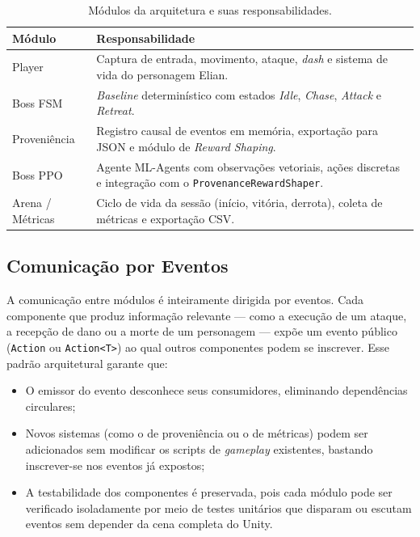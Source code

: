\begin{table}[htb]
    \centering
    \caption{Módulos da arquitetura e suas responsabilidades.}
    \label{tab:modulos}
    \begin{tabular}{l p{9.5cm}}
        \toprule
        \textbf{Módulo}     & \textbf{Responsabilidade} \\
        \midrule
        Player              & Captura de entrada, movimento, ataque, \textit{dash}
                              e sistema de vida do personagem Elian. \\
        \addlinespace
        Boss FSM             & \textit{Baseline} determinístico com estados
                              \textit{Idle}, \textit{Chase}, \textit{Attack} e
                              \textit{Retreat}. \\
        \addlinespace
        Proveniência         & Registro causal de eventos em memória, exportação
                              para JSON e módulo de \textit{Reward Shaping}. \\
        \addlinespace
        Boss PPO             & Agente ML-Agents com observações vetoriais, ações
                              discretas e integração com o
                              \texttt{ProvenanceRewardShaper}. \\
        \addlinespace
        Arena / Métricas     & Ciclo de vida da sessão (início, vitória, derrota),
                              coleta de métricas e exportação CSV. \\
        \bottomrule
    \end{tabular}
\end{table}

\subsection{Comunicação por Eventos}
\label{subsec:comunicacao-eventos}

A comunicação entre módulos é inteiramente dirigida por eventos. Cada
componente que produz informação relevante --- como a execução de um ataque,
a recepção de dano ou a morte de um personagem --- expõe um evento público
(\texttt{Action} ou \texttt{Action<T>}) ao qual outros componentes podem se
inscrever. Esse padrão arquitetural garante que:

\begin{itemize}
    \item O emissor do evento desconhece seus consumidores, eliminando
          dependências circulares;
    \item Novos sistemas (como o de proveniência ou o de métricas) podem ser
          adicionados sem modificar os scripts de \textit{gameplay} existentes,
          bastando inscrever-se nos eventos já expostos;
    \item A testabilidade dos componentes é preservada, pois cada módulo pode
          ser verificado isoladamente por meio de testes unitários que disparam
          ou escutam eventos sem depender da cena completa do Unity.
\end{itemize}

